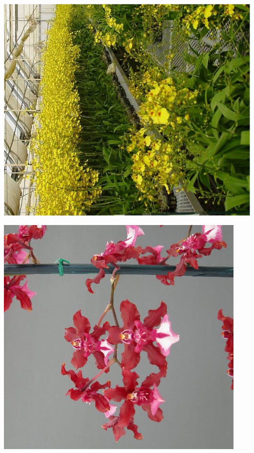 \documentclass{article}
\begin{document}
\begin{center}
\includegraphics[height=0.925\paperheight]{../Orchid_Oncidium_Plant.jpg}
\end{center}
\newpage

\begin{center}
\includegraphics[height=0.925\paperheight]{../Orchid_Oncidium_Red.jpg}
\end{center}
\newpage
\end{document}
